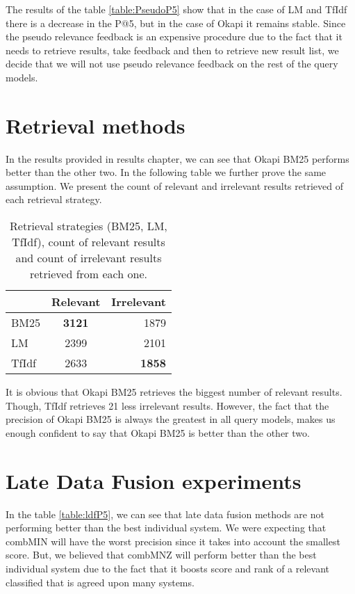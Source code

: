 The results of the table \ref{table:PseudoP5} show that in the case of LM and TfIdf there is a decrease in the P@5, but in the case of Okapi it remains stable. Since the pseudo relevance feedback is an expensive procedure due to the fact that it needs to retrieve results, take feedback and then to retrieve new result list, we decide that we will not use pseudo relevance feedback on the rest of the query models.



\section{Retrieval methods}

In the results provided in results chapter, we can see that Okapi BM25 performs better than the other two. In the following table we further prove the same assumption. We present the count of relevant and irrelevant results retrieved of each retrieval strategy.

\begin{table}[H]
\begin{center}
\caption{Retrieval strategies (BM25, LM, TfIdf), count of relevant results and count of irrelevant results retrieved from each one.}

\begin{tabular}{lcr}
\midrule
 & Relevant & Irrelevant  \\
\midrule
	BM25 & \textbf{3121} & 1879 \\
	LM & 2399 & 2101 \\
	TfIdf & 2633 & \textbf{1858} \\
\bottomrule
\end{tabular}
\end{center}
\end{table}

It is obvious that Okapi BM25 retrieves the biggest number of relevant results. Though, TfIdf retrieves 21 less irrelevant results. However, the fact that the precision of Okapi BM25 is always the greatest in all query models, makes us enough confident to say that Okapi BM25 is better than the other two.

\section{Late Data Fusion experiments}

In the table \ref{table:ldfP5}, we can see that late data fusion methods are not performing better than the best individual system. We were expecting that combMIN will have the worst precision since it takes into account the smallest score. But, we believed that combMNZ will perform better than the best individual system due to the fact that it boosts score and rank of a relevant classified that is agreed upon many systems.

